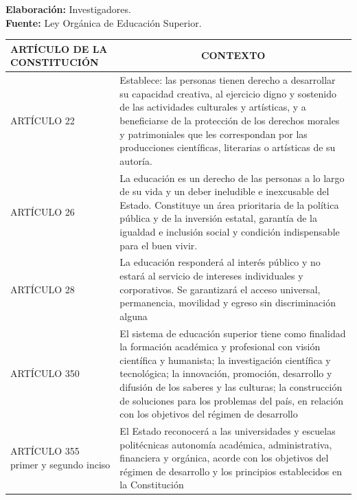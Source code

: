 \documentclass[12pt, a4paper, nofontenc, numbers=endperiod]{apa7}
\begin{document}
{\vspace*{-1cm}
\begin{center}
	\footnotesize
	\singlespacing\textbf{Elaboración:} Investigadores.\\
	\textbf{Fuente:} Ley Orgánica de Educación Superior.
\end{center}

\newpage
\begin{table}[h]
	{\renewcommand{\arraystretch}{1.2}	
		{\singlespacing
			\begin{tabular}{|p{4cm}|p{11.1cm}|}
				\hline
				\multicolumn{1}{|p{4cm}|}{ARTÍCULO DE LA CONSTITUCIÓN} &  \multicolumn{1}{c|}{CONTEXTO} \\
				\hline
				\vspace*{4mm}\centering\footnotesize ARTÍCULO 22 & \footnotesize Establece: las personas tienen derecho a desarrollar su capacidad creativa, al ejercicio digno  y sostenido de las actividades culturales  y artísticas, y a beneficiarse de la protección de los derechos morales y patrimoniales  que les correspondan por las producciones científicas, literarias o artísticas de su autoría. \\
				\hline
				\vspace*{3mm}\centering\footnotesize ARTÍCULO 26 &   \footnotesize La educación es un derecho de las personas a lo largo de su vida y un deber ineludible e inexcusable del Estado. Constituye un área prioritaria de la política pública y de la inversión estatal, garantía de la igualdad e inclusión social y condición indispensable para el buen vivir.\\
				\hline
				\vspace*{2mm}\centering\footnotesize ARTÍCULO 28
				&   \footnotesize La educación responderá al interés público y no estará al servicio de intereses individuales y corporativos. Se garantizará el acceso universal, permanencia, movilidad y egreso sin discriminación alguna\\
				\hline
				\vspace*{8mm}\centering\footnotesize ARTÍCULO 350 &  El sistema de educación superior tiene como finalidad la formación académica y profesional con visión científica y humanista; la investigación científica y tecnológica; la innovación, promoción, desarrollo y difusión de los saberes y las culturas; la construcción de soluciones para los problemas del país, en relación con los objetivos del régimen de desarrollo
				\\
				\hline
				\vspace*{1mm}\centering\footnotesize ARTÍCULO 355 primer y segundo inciso &   \footnotesize El Estado reconocerá a las universidades y escuelas politécnicas autonomía académica, administrativa, financiera y orgánica, acorde con los objetivos del régimen de desarrollo y los principios establecidos en la Constitución \\

\end{tabular}}}
\end{table}}
\end{document}
